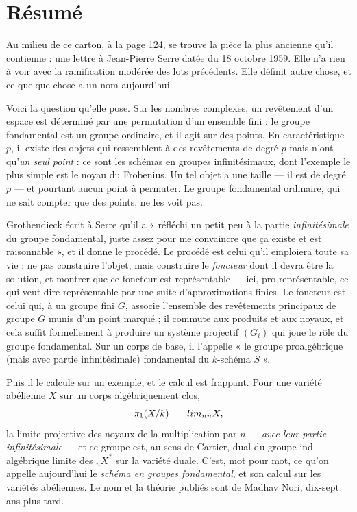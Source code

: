 \documentclass[11pt,a4paper]{article}
\begin{document}
\section*{Résumé}

\begin{resume}
Au milieu de ce carton, à la page 124, se trouve la pièce la plus ancienne
qu'il contienne : une lettre à Jean-Pierre Serre datée du 18 octobre 1959. Elle
n'a rien à voir avec la ramification modérée des lots précédents. Elle définit
autre chose, et ce quelque chose a un nom aujourd'hui.

Voici la question qu'elle pose. Sur les nombres complexes, un revêtement d'un
espace est déterminé par une permutation d'un ensemble fini : le groupe
fondamental est un groupe ordinaire, et il agit sur des points. En
caractéristique $p$, il existe des objets qui ressemblent à des revêtements de
degré $p$ mais n'ont qu'\emph{un seul point} : ce sont les schémas en groupes
infinitésimaux, dont l'exemple le plus simple est le noyau du Frobenius. Un
tel objet a une taille --- il est de degré $p$ --- et pourtant aucun point à
permuter. Le groupe fondamental ordinaire, qui ne sait compter que des points,
ne les voit pas.

Grothendieck écrit à Serre qu'il a « réfléchi un petit peu à la partie
\emph{infinitésimale} du groupe fondamental, juste assez pour me convaincre que
ça existe et est raisonnable », et il donne le procédé. Le procédé est celui
qu'il emploiera toute sa vie : ne pas construire l'objet, mais construire le
\emph{foncteur} dont il devra être la solution, et montrer que ce foncteur est
représentable --- ici, pro-représentable, ce qui veut dire représentable par une
suite d'approximations finies. Le foncteur est celui qui, à un groupe fini
$G$, associe l'ensemble des revêtements principaux de groupe $G$ munis d'un
point marqué ; il commute aux produits et aux noyaux, et cela suffit
formellement à produire un système projectif $(G_{i})$ qui joue le rôle du
groupe fondamental. Sur un corps de base, il l'appelle « le groupe
proalgébrique (mais avec partie infinitésimale) fondamental du $k$-schéma
$S$ ».

Puis il le calcule sur un exemple, et le calcul est frappant. Pour une variété
abélienne $X$ sur un corps algébriquement clos,
\[
  \pi_{1}(X/k) \;=\; \varprojlim_{n} {}_{n}X ,
\]
la limite projective des noyaux de la multiplication par $n$ --- \emph{avec
leur partie infinitésimale} --- et ce groupe est, au sens de Cartier, dual du
groupe ind-algébrique limite des ${}_{n}X^{*}$ sur la variété duale. C'est,
mot pour mot, ce qu'on appelle aujourd'hui le \emph{schéma en groupes
fondamental}, et son calcul sur les variétés abéliennes. Le nom et la théorie
publiés sont de Madhav Nori, dix-sept ans plus tard.


\end{resume}
\end{document}

